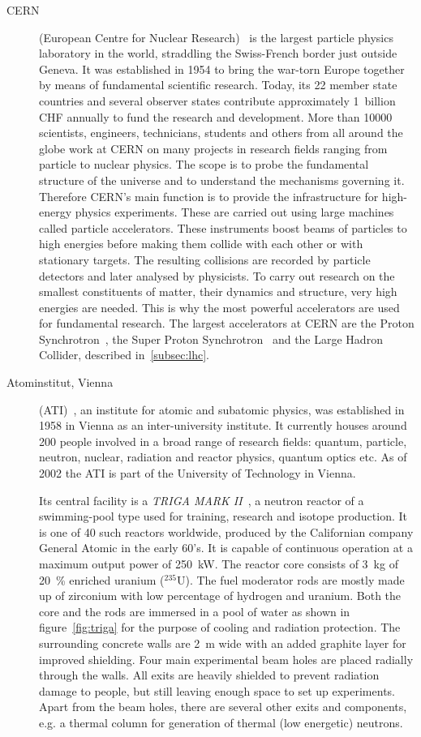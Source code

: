 \begin{description}
\item[CERN] (European Centre for Nuclear Research)~\cite{CERN:00000} is the largest particle physics laboratory in the world, straddling the Swiss-French border just outside Geneva. It was established in 1954 to bring the war-torn Europe together by means of fundamental scientific research. Today, its 22 member state countries and several observer states contribute approximately 1~billion CHF annually to fund the research and development. More than 10000 scientists, engineers, technicians, students and others from all around the globe work at CERN on many projects in research fields ranging from particle to nuclear physics. The scope is to probe the fundamental structure of the universe and to understand the mechanisms governing it. Therefore CERN's main function is to provide the infrastructure for high-energy physics experiments. These are carried out using large machines called particle accelerators. These instruments boost beams of particles to high energies before making them collide with each other or with stationary targets. The resulting collisions are recorded by particle detectors and later analysed by physicists. To carry out research on the smallest constituents of matter, their dynamics and structure, very high energies are needed. This is why the most powerful accelerators are used for fundamental research. The largest accelerators at CERN are the Proton Synchrotron~\cite{}, the Super Proton Synchrotron~\cite{Mills:133232} and the Large Hadron Collider, described in~\ref{subsec:lhc}.



\item[Atominstitut, Vienna] (ATI)~\cite{AtomInst:00000}, an institute for atomic and subatomic physics, was established in 1958 in Vienna as an inter-university institute. It currently houses around 200 people involved in a broad range of research fields: quantum, particle, neutron, nuclear, radiation and reactor physics, quantum optics etc. As of 2002 the ATI is part of the University of Technology in Vienna.

Its central facility is a \emph{TRIGA MARK II}~\cite{Triga:00000}, a neutron reactor of a swimming-pool type used for training, research and isotope production. It is one of 40 such reactors worldwide, produced by the Californian company General Atomic in the early 60's. It is capable of continuous operation at a maximum output power of 250~kW. 
The reactor core consists of 3~kg of 20~\% enriched uranium ($^{235}$U). The fuel moderator rods are mostly made up of zirconium with low percentage of hydrogen and uranium. Both the core and the rods are immersed in a pool of water as shown in figure~\ref{fig:triga} for the purpose of cooling and radiation protection. The surrounding concrete walls are 2~m wide with an added graphite layer for improved shielding. Four main experimental beam holes are placed radially through the walls. All exits are heavily shielded to prevent radiation damage to people, but still leaving enough space to set up experiments. Apart from the beam holes, there are several other exits and components, e.g. a thermal column for generation of thermal (low energetic) neutrons.


\end{description}
